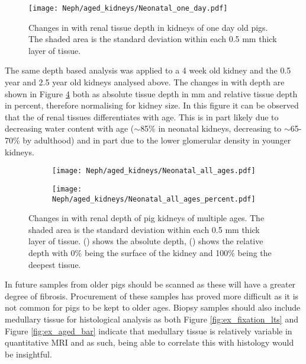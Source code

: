 \begin{figure}[H]
	\centering
	\texttt{[image: Neph/aged\_kidneys/Neonatal\_one\_day.pdf]}
	\caption{Changes in \tone with renal tissue depth in kidneys of one day old pigs. The shaded area is the standard deviation within each 0.5 mm thick layer of tissue.}
	\label{fig:ex_neo_layers_one_day}	
\end{figure}

The same depth based analysis was applied to a 4 week old kidney and the 0.5 year and 2.5 year old kidneys analysed above. The changes in \tone with depth are shown in Figure \ref{fig:ex_neo_layers_all_ages} both as absolute tissue depth in mm and relative tissue depth in percent, therefore normalising for kidney size. In this figure it can be observed that the \tone of renal tissues differentiates with age. This is in part likely due to decreasing water content with age ($\sim$85\% in neonatal kidneys, decreasing to $\sim$65-70\% by adulthood) and in part due to the lower glomerular density in younger kidneys.

\begin{figure}[H]
	\centering
	\begin{subfigure}[c]{0.47\textwidth}
		\centering
		\texttt{[image: Neph/aged\_kidneys/Neonatal\_all\_ages.pdf]}
		\caption{}
		\label{fig:ex_neo_layers_all_ages_abs}
	\end{subfigure}
	\hfill
	\begin{subfigure}[c]{0.47\textwidth}
		\centering
		\texttt{[image: Neph/aged\_kidneys/Neonatal\_all\_ages\_percent.pdf]}
		\caption{}
		\label{fig:ex_neo_layers_all_ages_per}
	\end{subfigure}
	\caption{Changes in \tone with renal depth of pig kidneys of multiple ages. The shaded area is the standard deviation within each 0.5 mm thick layer of tissue. () shows the absolute depth, () shows the relative depth with 0\% being the surface of the kidney and 100\% being the deepest tissue.}
	\label{fig:ex_neo_layers_all_ages}
\end{figure}

In future samples from older pigs should be scanned as these will have a greater degree of fibrosis. Procurement of these samples has proved more difficult as it is not common for pigs to be kept to older ages. Biopsy samples should also include medullary tissue for histological analysis as both Figure \ref{fig:ex_fixation_lts} and Figure \ref{fig:ex_aged_bar} indicate that medullary tissue is relatively variable in quantitative \ac{MRI} and as such, being able to correlate this with histology would be insightful.

